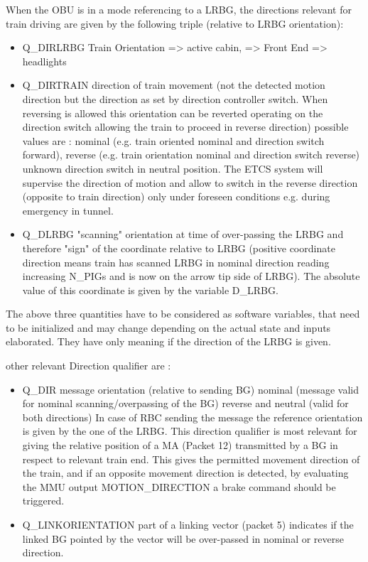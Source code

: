 When the \gls{OBU} is in a mode referencing to a LRBG, the directions relevant for train driving are given by the following triple (relative to LRBG orientation):
\begin{itemize}
\item Q\_DIRLRBG Train Orientation => active cabin, => Front End => headlights
\item Q\_DIRTRAIN direction of train movement (not the detected motion direction but the direction as set by direction controller switch.
When reversing is allowed this orientation can be reverted operating on the direction switch allowing the train to proceed in reverse direction)  possible values are : nominal (e.g. train oriented nominal and direction switch forward), reverse (e.g. train orientation nominal and direction switch reverse) unknown direction switch in neutral position. The ETCS system will supervise the direction of motion and allow to switch in the reverse direction (opposite to train direction) only under foreseen conditions e.g. during emergency in tunnel.
\item Q\_DLRBG "scanning" orientation at time of over-passing the LRBG and therefore "sign" of the coordinate relative to LRBG (positive coordinate direction means train has scanned LRBG in nominal direction reading increasing N\_PIGs and is now on the arrow tip side of LRBG). The absolute value of this coordinate is given by the variable D\_LRBG.
\end{itemize}
The above three quantities have to be considered as software variables, that need to be initialized and may change depending on the actual state and inputs elaborated. They have only meaning if the direction of the LRBG is given.

other relevant Direction qualifier are :
\begin{itemize}
\item Q\_DIR message orientation (relative to sending BG) nominal (message valid for nominal scanning/overpassing of the BG) reverse and neutral (valid for both directions) In case of RBC sending the message the reference orientation is given by the one of the LRBG.
This direction qualifier is most relevant for giving the relative position of a MA (Packet 12) transmitted by a BG  in respect to relevant train end. This gives the permitted movement direction of the train, and if an opposite movement direction is detected, by evaluating the \gls{MMU} output MOTION\_DIRECTION a brake command should be triggered.
\item Q\_LINKORIENTATION part of a linking vector (packet 5) indicates if the linked BG pointed by the vector will be over-passed in nominal or reverse direction.
\end{itemize}


